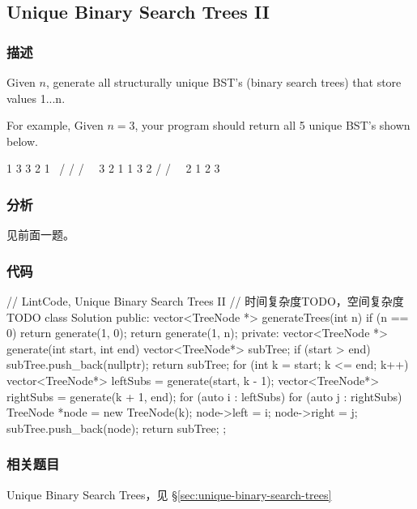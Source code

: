 \subsection{Unique Binary Search Trees II}
\label{sec:unique-binary-search-trees-ii}


\subsubsection{描述}
Given $n$, generate all structurally unique BST's (binary search trees) that store values 1...n.

For example,
Given $n = 3$, your program should return all 5 unique BST's shown below.
\begin{Code}
   1         3     3      2      1
    \       /     /      / \      \
     3     2     1      1   3      2
    /     /       \                 \
   2     1         2                 3
\end{Code}


\subsubsection{分析}
见前面一题。


\subsubsection{代码}

\begin{Code}
// LintCode, Unique Binary Search Trees II
// 时间复杂度TODO，空间复杂度TODO
class Solution {
public:
    vector<TreeNode *> generateTrees(int n) {
        if (n == 0) return generate(1, 0);
        return generate(1, n);
    }
private:
    vector<TreeNode *> generate(int start, int end) {
        vector<TreeNode*> subTree;
        if (start > end) {
            subTree.push_back(nullptr);
            return subTree;
        }
        for (int k = start; k <= end; k++) {
            vector<TreeNode*> leftSubs = generate(start, k - 1);
            vector<TreeNode*> rightSubs = generate(k + 1, end);
            for (auto i : leftSubs) {
                for (auto j : rightSubs) {
                    TreeNode *node = new TreeNode(k);
                    node->left = i;
                    node->right = j;
                    subTree.push_back(node);
                }
            }
        }
        return subTree;
    }
};
\end{Code}


\subsubsection{相关题目}
\begindot
\item Unique Binary Search Trees，见 \S \ref{sec:unique-binary-search-trees}
\myenddot


